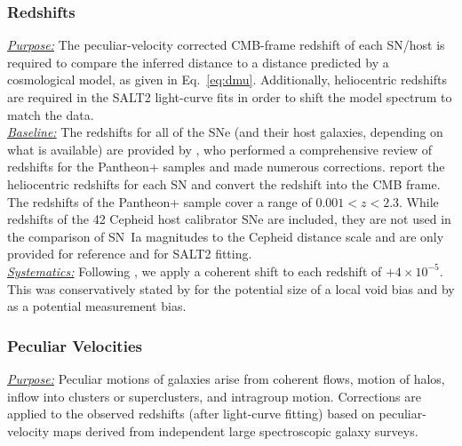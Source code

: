 \documentclass[twocolumn]{aastex63}
\begin{document}
\subsubsection{\textbf{Redshifts}}
\label{subsubsection:redshifts}

\noindent\uline{\textit{Purpose:}} The {peculiar-velocity corrected CMB-frame} redshift of each SN/host is required to compare the inferred distance to a distance predicted by a cosmological model, as given in Eq.~\ref{eq:dmu}. Additionally, {heliocentric} redshifts are required in the SALT2 light-curve fits in order to shift the model spectrum to match the data. \\
\uline{\textit{Baseline:}} The redshifts for all of the SNe (and their host galaxies, depending on what is available) are provided by \cite{carr21}, who performed a comprehensive review of redshifts for the Pantheon+ samples and {made numerous corrections.} \cite{carr21} report the heliocentric redshifts for each SN and convert the redshift into the CMB frame. The redshifts of the Pantheon+ sample cover a range of $0.001 < z < 2.3$. While redshifts of the 42 Cepheid host calibrator SNe are included, they are not used in the {comparison of} SN~Ia magnitudes to the Cepheid distance scale and are only provided for reference and for SALT2 fitting. \\
\uline{\textit{Systematics:}} Following \cite{carr21}, we apply a coherent shift to each redshift of $+4\times 10^{-5}$. This was conservatively stated by \cite{Calcino17} for the potential size of a local void bias and by \cite{davis19} as a potential measurement bias.


\subsubsection{\textbf{Peculiar Velocities}}
\label{subsubsection:pvs}

\noindent\uline{\textit{Purpose:}} Peculiar motions of galaxies arise from coherent flows, motion of halos, inflow into clusters or superclusters, and intragroup motion. Corrections are applied to the observed redshifts (after light-curve fitting) based on peculiar-velocity maps derived from independent large spectroscopic galaxy surveys.  
\end{document}
